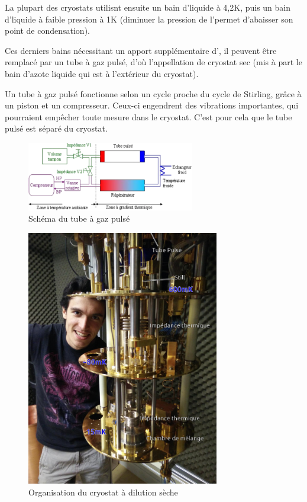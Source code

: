 La plupart des cryostats utilisnt ensuite un bain d'\HeQ liquide à 4,2K, puis un bain d'\HeQ liquide à faible pression à 1K (diminuer la pression de l'\HeQ permet d'abaisser son point de condensation).

Ces derniers bains nécessitant un apport supplémentaire d'\HeQ, il peuvent être remplacé par un tube à gaz pulsé, d'où l'appellation de cryostat sec (mis à part le bain d'azote liquide qui est à l'extérieur du cryostat).

Un tube à gaz pulsé fonctionne selon un cycle proche du cycle de Stirling, grâce à un piston et un compresseur. Ceux-ci engendrent des vibrations importantes, qui pourraient empêcher toute mesure dans le cryostat. C'est pour cela que le tube pulsé est séparé du cryostat.

\begin{figure}[ht]
    \begin{center}
        \includegraphics[width=0.65\textwidth]{Images/Cryostat_PulseTube_Schema.png}
        \caption{Schéma du tube à gaz pulsé}
    \end{center}
\end{figure}


\begin{figure}[ht]
    \begin{center}
        \includegraphics[width=0.75\textwidth]{Images/PhotoCryostat}
        \caption{Organisation du cryostat à dilution sèche}
    \end{center}
\end{figure}
